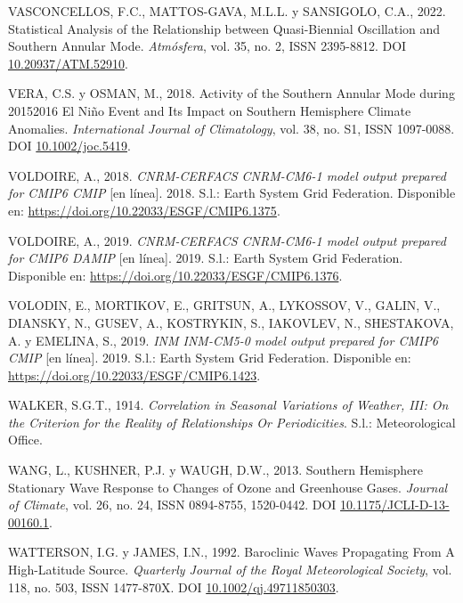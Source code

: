 \documentclass[12pt,oneside,a4paper]{reedthesis}
\newlength{\cslhangindent}
\newenvironment{CSLReferences}[2] %
 {%
  \setlength{\parindent}{0pt}
  \ifodd #1 \everypar{\setlength{\hangindent}{\cslhangindent}}\ignorespaces\fi
  \ifnum #2 > 0
  \setlength{\parskip}{#2\baselineskip}
  \fi
 }%
 {}
\begin{document}
\begin{CSLReferences}{1}{0}
\leavevmode{}%
VASCONCELLOS, F.C., MATTOS-GAVA, M.L.L. y SANSIGOLO, C.A., 2022. Statistical Analysis of the Relationship between {Quasi-Biennial Oscillation} and {Southern Annular Mode}. \emph{Atm{ó}sfera}, vol. 35, no. 2, ISSN 2395-8812. DOI \href{https://doi.org/10.20937/ATM.52910}{10.20937/ATM.52910}.

\leavevmode{}%
VERA, C.S. y OSMAN, M., 2018. Activity of the {Southern Annular Mode} during 2015{\textendash}2016 {El Ni{ñ}o} Event and Its Impact on {Southern Hemisphere} Climate Anomalies. \emph{International Journal of Climatology}, vol. 38, no. S1, ISSN 1097-0088. DOI \href{https://doi.org/10.1002/joc.5419}{10.1002/joc.5419}.

\leavevmode{}%
VOLDOIRE, A., 2018. \emph{CNRM-CERFACS CNRM-CM6-1 model output prepared for CMIP6 CMIP} {[}en línea{]}. 2018. S.l.: Earth System Grid Federation. Disponible en: \url{https://doi.org/10.22033/ESGF/CMIP6.1375}.

\leavevmode{}%
VOLDOIRE, A., 2019. \emph{CNRM-CERFACS CNRM-CM6-1 model output prepared for CMIP6 DAMIP} {[}en línea{]}. 2019. S.l.: Earth System Grid Federation. Disponible en: \url{https://doi.org/10.22033/ESGF/CMIP6.1376}.

\leavevmode{}%
VOLODIN, E., MORTIKOV, E., GRITSUN, A., LYKOSSOV, V., GALIN, V., DIANSKY, N., GUSEV, A., KOSTRYKIN, S., IAKOVLEV, N., SHESTAKOVA, A. y EMELINA, S., 2019. \emph{INM INM-CM5-0 model output prepared for CMIP6 CMIP} {[}en línea{]}. 2019. S.l.: Earth System Grid Federation. Disponible en: \url{https://doi.org/10.22033/ESGF/CMIP6.1423}.

\leavevmode{}%
WALKER, S.G.T., 1914. \emph{Correlation in {Seasonal Variations} of {Weather}, {III}: {On} the {Criterion} for the {Reality} of {Relationships Or Periodicities}}. S.l.: {Meteorological Office}.

\leavevmode{}%
WANG, L., KUSHNER, P.J. y WAUGH, D.W., 2013. Southern {Hemisphere Stationary Wave Response} to {Changes} of {Ozone} and {Greenhouse Gases}. \emph{Journal of Climate}, vol. 26, no. 24, ISSN 0894-8755, 1520-0442. DOI \href{https://doi.org/10.1175/JCLI-D-13-00160.1}{10.1175/JCLI-D-13-00160.1}.

\leavevmode{}%
WATTERSON, I.G. y JAMES, I.N., 1992. Baroclinic {Waves Propagating From A High-Latitude Source}. \emph{Quarterly Journal of the Royal Meteorological Society}, vol. 118, no. 503, ISSN 1477-870X. DOI \href{https://doi.org/10.1002/qj.49711850303}{10.1002/qj.49711850303}.


\end{CSLReferences}
\end{document}
